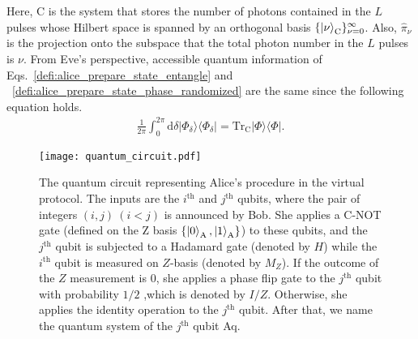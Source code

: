 \documentclass[twocolumn,superscriptaddress,pra,footinbib,notitlepage]{revtex4-1}
\newcommand{\ketbra}[2]{| #1 \rangle \langle #2 |}
\newcommand{\1}{\mbox{1}\hspace{-0.25em}\mbox{l}}
\begin{document}
Here, C is the system that stores the number of photons contained in the $L$ pulses whose Hilbert space is spanned by an orthogonal basis $\{\ket{\nu}_\textrm{C}\}_{\nu=0}^\infty$. Also, $\hat{\pi}_\nu$ is the projection onto the subspace that the total photon number in the $L$ pulses is $\nu$. 
From Eve's perspective, accessible quantum information of Eqs.~\eqref{defi:alice_prepare_state_entangle} and ~\eqref{defi:alice_prepare_state_phase_randomized} are the same since the following equation holds. 
\begin{align}
\frac{1}{2\pi}\int_0^{2\pi}\mathrm{d}\delta\ketbra{\Phi_\delta}{\Phi_\delta}=\mathrm{Tr}_\textrm{C}\ketbra{\Phi}{\Phi}.
\end{align}

\begin{figure}[t]
\begin{center}
\texttt{[image: quantum\_circuit.pdf]}
\caption{The quantum circuit representing Alice's procedure in the virtual protocol. The inputs are the $i^\mathrm{th}$ and $j^\mathrm{th}$ qubits, where the pair of integers $(i, j)~(i<j)$ is announced by Bob. She applies a C-NOT gate (defined on the Z basis $\{\ket{0}_\textrm{A},\ket{1}_\textrm{A}\}$) to these qubits, and the $j^\mathrm{th}$ qubit is subjected to a Hadamard gate (denoted by $H$) while the $i^\mathrm{th}$ qubit is measured on $Z$-basis (denoted by $M_Z$). If the outcome of the $Z$ measurement is $0$, she applies a phase flip gate to the $j^\mathrm{th}$ qubit with probability $1/2$ ,which is denoted by $I/Z$. Otherwise, she applies the identity operation to the $j^\mathrm{th}$ qubit. After that, we name the quantum system of the $j^\mathrm{th}$ qubit Aq.}
\label{fig:quantum_circuit}
\end{center}
\end{figure}
\end{document}
